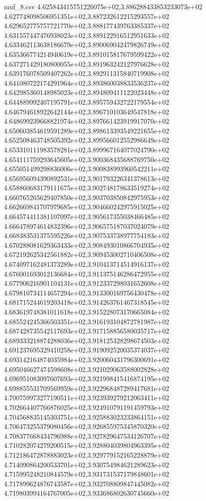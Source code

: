 \begin{filecontents*}{muf_8.csv}
4.625843415751226075e+02,3.886288433853233073e+02
4.627748098506951351e+02,3.887232612215293557e+02
4.629652775757721770e+02,3.888177439763385337e+02
4.631557447476938023e+02,3.889122916512951633e+02
4.633462113638186679e+02,3.890069042479826749e+02
4.635366774214940619e+02,3.891015817679599422e+02
4.637271429180800055e+02,3.891963242127976628e+02
4.639176078509407262e+02,3.892911315840719908e+02
4.641080722174291964e+02,3.893860038833536237e+02
4.642985360148985023e+02,3.894809411122023448e+02
4.644889992407195791e+02,3.895759432722179554e+02
4.646794618922642144e+02,3.896710103649547818e+02
4.648699239668821974e+02,3.897661423919917070e+02
4.650603854619591289e+02,3.898613393549221655e+02
4.652508463748505392e+02,3.899566012552986649e+02
4.653310111983578281e+02,3.899967164077024790e+02
4.654111759293645605e+02,3.900368435688769750e+02
4.655051499298836006e+02,3.900838993960542211e+02
4.656956094390892531e+02,3.901793226341378613e+02
4.658860683179111675e+02,3.902748178633519274e+02
4.660765265629407850e+02,3.903703850842975953e+02
4.662669841707979685e+02,3.904660242975915025e+02
4.664574411381107097e+02,3.905617355038466485e+02
4.666478974614832396e+02,3.906575187037024079e+02
4.668383531375595226e+02,3.907533738977754183e+02
4.670288081629363433e+02,3.908493010866704935e+02
4.672192625342561882e+02,3.909453002710406508e+02
4.674097162481373289e+02,3.910413714514916137e+02
4.676001693012136684e+02,3.911375146286472955e+02
4.677906216901104131e+02,3.912337298031652608e+02
4.679810734114657294e+02,3.913300169756430478e+02
4.681715244619203418e+02,3.914263761467318545e+02
4.683619748381011618e+02,3.915228073170665084e+02
4.685524245366503351e+02,3.916193104872781987e+02
4.687428735542117693e+02,3.917158856580035717e+02
4.689333218874288036e+02,3.918125328298674503e+02
4.691237695329410258e+02,3.919092520035374037e+02
4.693142164874035984e+02,3.920060431796300691e+02
4.695046627474598608e+02,3.921029063588002828e+02
4.696951083097607693e+02,3.921998415416874195e+02
4.698855531709569959e+02,3.922968487289417681e+02
4.700759973277190511e+02,3.923939279212063411e+02
4.702664407766876025e+02,3.924910791191459793e+02
4.704568835145303751e+02,3.925883023233864151e+02
4.706473255379080456e+02,3.926855975345870320e+02
4.708377668434796988e+02,3.927829647534126707e+02
4.710282074279200515e+02,3.928804039804963395e+02
4.712186472878883023e+02,3.929779152165228879e+02
4.714090864200533701e+02,3.930754984621289623e+02
4.715995248210844579e+02,3.931731537179848601e+02
4.717899624876743587e+02,3.932708809847445082e+02
4.719803994164767005e+02,3.933686802630745660e+02

\end{filecontents*}
